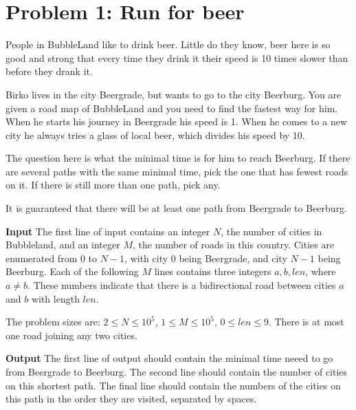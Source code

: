 \normalfont\documentclass[letterpaper,11pt]{article}
\begin{document}
\newcommand{\header}{
	\noindent \fbox{
	\begin{minipage}{6.4in}
  	\medskip
  	\textbf{ACM algorithm practice} \hfill \textbf{Fall 2015} \\[1mm]
  	\begin{center}
    	{\Large Week 1 Problems} \\[3mm]
  	\end{center}
	\today \hfill \itshape{Timothy Johnson}
	\medskip
	\end{minipage}}
}

\bigskip

\section*{Problem 1: Run for beer}
People in BubbleLand like to drink beer. Little do they know, beer here is so good and strong that every time they drink it their speed is 10 times slower than before they drank it.

Birko lives in the city Beergrade, but wants to go to the city Beerburg. You are given a road map of BubbleLand and you need to find the fastest way for him. When he starts his journey in Beergrade his speed is 1. When he comes to a new city he always tries a glass of local beer, which divides his speed by 10.

The question here is what the minimal time is for him to reach Beerburg. If there are several paths with the same minimal time, pick the one that has fewest roads on it. If there is still more than one path, pick any.

It is guaranteed that there will be at least one path from Beergrade to Beerburg.

\textbf{Input} \newline
The first line of input contains an integer $N$, the number of cities in Bubbleland, and an integer $M$, the number of roads in this country. Cities are enumerated from 0 to $N - 1$, with city 0 being Beergrade, and city $N - 1$ being Beerburg. Each of the following $M$ lines contains three integers $a, b, len$, where $a \neq b$. These numbers indicate that there is a bidirectional road between cities $a$ and $b$ with length $len$.

The problem sizes are: $2 \leq N \leq 10^5$, $1 \leq M \leq 10^5$, $0 \leq len \leq 9$. There is at most one road joining any two cities.

\textbf{Output} \newline
The first line of output should contain the minimal time neeed to go from Beergrade to Beerburg. The second line should contain the number of cities on this shortest path. The final line should contain the numbers of the cities on this path in the order they are visited, separated by spaces.
\end{document}
